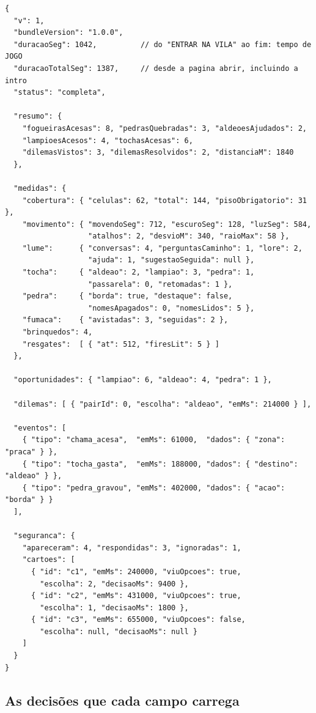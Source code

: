 \begin{lstlisting}[language=jsonunoo, caption={\rota{POST /vila/sessoes/:id/concluir} --- corpo (abreviado)}]
{
  "v": 1,
  "bundleVersion": "1.0.0",
  "duracaoSeg": 1042,          // do "ENTRAR NA VILA" ao fim: tempo de JOGO
  "duracaoTotalSeg": 1387,     // desde a pagina abrir, incluindo a intro
  "status": "completa",

  "resumo": {
    "fogueirasAcesas": 8, "pedrasQuebradas": 3, "aldeoesAjudados": 2,
    "lampioesAcesos": 4, "tochasAcesas": 6,
    "dilemasVistos": 3, "dilemasResolvidos": 2, "distanciaM": 1840
  },

  "medidas": {
    "cobertura": { "celulas": 62, "total": 144, "pisoObrigatorio": 31 },
    "movimento": { "movendoSeg": 712, "escuroSeg": 128, "luzSeg": 584,
                   "atalhos": 2, "desvioM": 340, "raioMax": 58 },
    "lume":      { "conversas": 4, "perguntasCaminho": 1, "lore": 2,
                   "ajuda": 1, "sugestaoSeguida": null },
    "tocha":     { "aldeao": 2, "lampiao": 3, "pedra": 1,
                   "passarela": 0, "retomadas": 1 },
    "pedra":     { "borda": true, "destaque": false,
                   "nomesApagados": 0, "nomesLidos": 5 },
    "fumaca":    { "avistadas": 3, "seguidas": 2 },
    "brinquedos": 4,
    "resgates":  [ { "at": 512, "firesLit": 5 } ]
  },

  "oportunidades": { "lampiao": 6, "aldeao": 4, "pedra": 1 },

  "dilemas": [ { "pairId": 0, "escolha": "aldeao", "emMs": 214000 } ],

  "eventos": [
    { "tipo": "chama_acesa",  "emMs": 61000,  "dados": { "zona": "praca" } },
    { "tipo": "tocha_gasta",  "emMs": 188000, "dados": { "destino": "aldeao" } },
    { "tipo": "pedra_gravou", "emMs": 402000, "dados": { "acao": "borda" } }
  ],

  "seguranca": {
    "apareceram": 4, "respondidas": 3, "ignoradas": 1,
    "cartoes": [
      { "id": "c1", "emMs": 240000, "viuOpcoes": true,
        "escolha": 2, "decisaoMs": 9400 },
      { "id": "c2", "emMs": 431000, "viuOpcoes": true,
        "escolha": 1, "decisaoMs": 1800 },
      { "id": "c3", "emMs": 655000, "viuOpcoes": false,
        "escolha": null, "decisaoMs": null }
    ]
  }
}
\end{lstlisting}

\subsection{As decisões que cada campo carrega}

